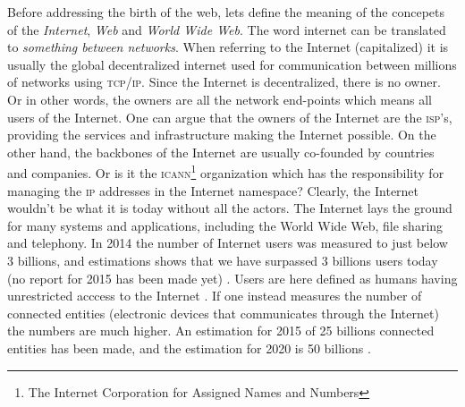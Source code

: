 \documentclass[a4paper,11pt]{kth-mag}
\begin{document}
      Before addressing the birth of the web, lets define the meaning of the concepets of the \emph{Internet}, \emph{Web} and \emph{World Wide Web}.
      The word internet can be translated to \emph{something between networks}. 
      When referring to the Internet (capitalized) it is usually the global decentralized internet used for communication between millions of networks using \textsc{tcp/ip}.
      Since the Internet is decentralized, there is no owner.
      Or in other words, the owners are all the network end-points which means all users of the Internet.
      One can argue that the owners of the Internet are the \textsc{isp}'s, providing the services and infrastructure making the Internet possible.
      On the other hand, the backbones of the Internet are usually co-founded by countries and companies.
      Or is it the \textsc{icann}\footnote{The Internet Corporation for Assigned Names and Numbers} organization which has the responsibility for managing the \textsc{ip} addresses in the Internet namespace?
      Clearly, the Internet wouldn't be what it is today without all the actors.
      The Internet lays the ground for many systems and applications, including the World Wide Web, file sharing and telephony.
      In 2014 the number of Internet users was measured to just below 3 billions, and estimations shows that we have surpassed 3 billions users today (no report for 2015 has been made yet) \cite{internet_live_stats}.
      Users are here defined as humans having unrestricted acccess to the Internet \cite{internet_live_stats}.
      If one instead measures the number of connected entities (electronic devices that communicates through the Internet) the numbers are much higher.
      An estimation for 2015 of 25 billions connected entities has been made, and the estimation for 2020 is 50 billions \cite{internet_of_things}.
      
\end{document}
